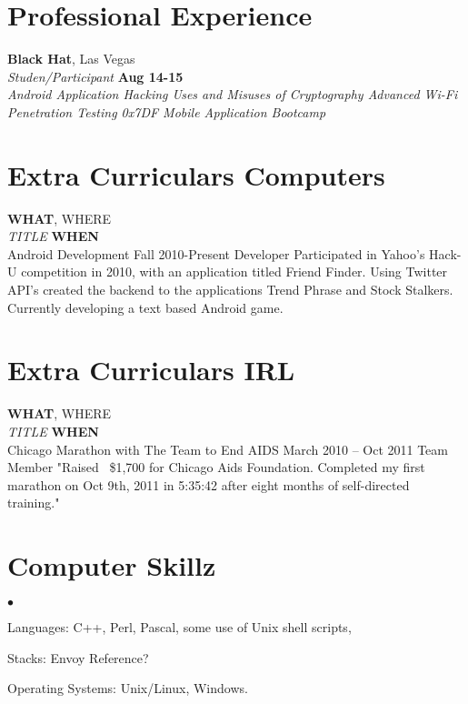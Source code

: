 \documentclass[margin,line]{res}
\newenvironment{list2}{
  \begin{list}{$\bullet$}{
      \setlength{\itemsep}{0in}
      \setlength{\parsep}{0in} \setlength{\parskip}{0in}
      \setlength{\topsep}{0in} \setlength{\partopsep}{0in} 
      \setlength{\leftmargin}{0.2in}}}{\end{list}}
\begin{document}
\begin{resume}
\section{\sc Professional Experience}

{\bf {Black Hat}}, {Las Vegas}\\
{\em Studen/Participant } \hfill {\bf Aug 14-15}\\
{\em Android Application Hacking
Uses and Misuses of Cryptography
Advanced Wi-Fi Penetration Testing
0x7DF Mobile Application Bootcamp }

\section{\sc Extra Curriculars Computers}
{\bf {WHAT}}, {WHERE}\\
{\em TITLE} \hfill {\bf  WHEN}\\

Android Development				Fall 2010-Present			Developer
Participated in Yahoo’s Hack-U competition in 2010, with an
 application titled Friend Finder. 
Using Twitter API’s created the backend to the applications 
Trend Phrase and Stock Stalkers. 
Currently developing a text based Android game.

\section{\sc Extra Curriculars IRL}


{\bf {WHAT}}, {WHERE}\\
{\em TITLE} \hfill {\bf  WHEN}\\

Chicago Marathon with
The Team to End AIDS				March 2010 – Oct 2011		Team Member
"Raised ~\$1,700 for Chicago Aids Foundation. Completed my first
marathon on Oct 9th, 2011 in 5:35:42 after eight months of self-directed training."


\section{\sc Computer Skillz} 
\begin{list2}
\item Languages:  C++, Perl, Pascal, some use of Unix shell scripts,
\item Stacks: Envoy Reference?
\item  
\item Operating Systems:  Unix/Linux, Windows.\\
\end{list2}


\end{resume}
\end{document}
